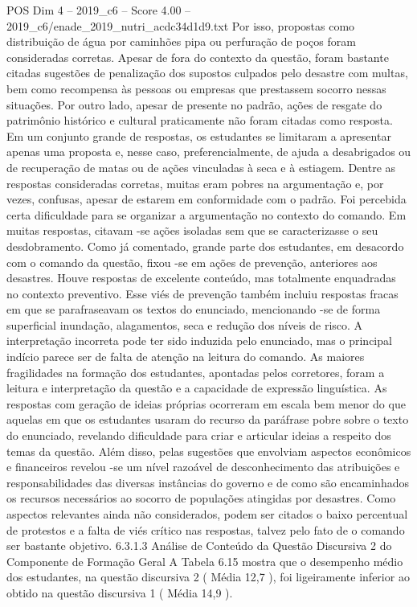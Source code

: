 \begin{textsample}{POS Dim 4 – 2019\_c6 – Score 4.00 – 2019\_c6/enade\_2019\_nutri\_acdc34d1d9.txt}
Por isso, propostas como distribuição de água por caminhões pipa ou perfuração de poços foram consideradas corretas.
Apesar de fora do contexto da questão, foram bastante citadas sugestões de penalização dos supostos culpados pelo desastre com multas, bem como recompensa às pessoas ou empresas que prestassem socorro nessas situações.
Por outro lado, apesar de presente no padrão, ações de resgate do patrimônio histórico e cultural praticamente não foram citadas como resposta.
Em um conjunto grande de respostas, os estudantes se limitaram a apresentar apenas uma proposta e, nesse caso, preferencialmente, de ajuda a desabrigados ou de recuperação de matas ou de ações vinculadas à seca e à estiagem.
Dentre as respostas consideradas corretas, muitas eram pobres na argumentação e, por vezes, confusas, apesar de estarem em conformidade com o padrão.
Foi percebida certa dificuldade para se organizar a argumentação no contexto do comando.
Em muitas respostas, citavam -se ações isoladas sem que se caracterizasse o seu desdobramento.
Como já comentado, grande parte dos estudantes, em desacordo com o comando da questão, fixou -se em ações de prevenção, anteriores aos desastres.
Houve respostas de excelente conteúdo, mas totalmente enquadradas no contexto preventivo.
Esse viés de prevenção também incluiu respostas fracas em que se parafraseavam os textos do enunciado, mencionando -se de forma superficial inundação, alagamentos, seca e redução dos níveis de risco.
A interpretação incorreta pode ter sido induzida pelo enunciado, mas o principal indício parece ser de falta de atenção na leitura do comando.
As maiores fragilidades na formação dos estudantes, apontadas pelos corretores, foram a leitura e interpretação da questão e a capacidade de expressão linguística.
As respostas com geração de ideias próprias ocorreram em escala bem menor do que aquelas em que os estudantes usaram do recurso da paráfrase pobre sobre o texto do enunciado, revelando dificuldade para criar e articular ideias a respeito dos temas da questão.
Além disso, pelas sugestões que envolviam aspectos econômicos e financeiros revelou -se um nível razoável de desconhecimento das atribuições e responsabilidades das diversas instâncias do governo e de como são encaminhados os recursos necessários ao socorro de populações atingidas por desastres.
Como aspectos relevantes ainda não considerados, podem ser citados o baixo percentual de protestos e a falta de viés crítico nas respostas, talvez pelo fato de o comando ser bastante objetivo. 6.3.1.3 Análise de Conteúdo da Questão Discursiva 2 do Componente de Formação Geral A Tabela 6.15 mostra que o desempenho médio dos estudantes, na questão discursiva 2 ( Média 12,7 ), foi ligeiramente inferior ao obtido na questão discursiva 1 ( Média 14,9 ).

\end{textsample}
